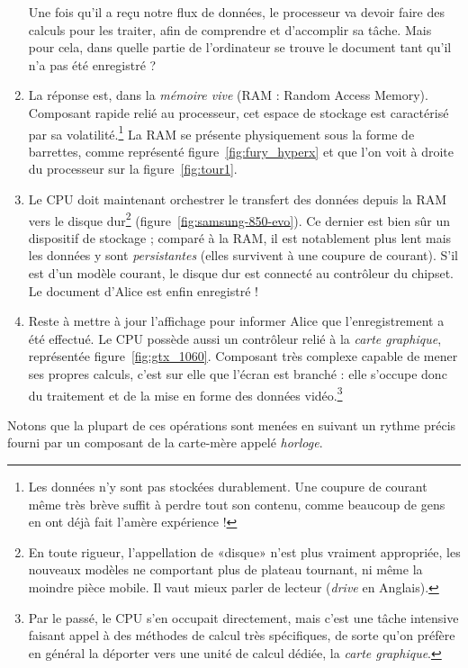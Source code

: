 \begin{enumerate}
	Une fois qu'il a reçu notre flux de données, le processeur va devoir faire des calculs pour les traiter, afin de comprendre et d'accomplir sa tâche. Mais pour cela, dans quelle partie de l'ordinateur se trouve le document tant qu'il n'a pas été enregistré ?
	\item La réponse est, dans la \emph{mémoire vive} (RAM : Random Access Memory). Composant rapide relié au processeur, cet espace de stockage est caractérisé par sa volatilité.\footnote{Les données n'y sont pas stockées durablement. Une coupure de courant même très brève suffit à perdre tout son contenu, comme beaucoup de gens en ont déjà fait l'amère expérience !} La RAM se présente physiquement sous la forme de barrettes, comme représenté figure~\ref{fig:fury_hyperx} et que l'on voit à droite du processeur sur la figure~\ref{fig:tour1}.
	\item Le CPU doit maintenant orchestrer le transfert des données depuis la RAM vers le disque dur\footnote{En toute rigueur, l'appellation de «disque» n'est plus vraiment appropriée, les nouveaux modèles ne comportant plus de plateau tournant, ni même la moindre pièce mobile. Il vaut mieux parler de lecteur (\emph{drive} en Anglais).} (figure~\ref{fig:samsung-850-evo}). Ce dernier est bien sûr un dispositif de stockage ; comparé à la RAM, il est notablement plus lent mais les données y sont \emph{persistantes} (elles survivent à une coupure de courant). S'il est d'un modèle courant, le disque dur est connecté au contrôleur du chipset. Le document d'Alice est enfin enregistré !
	\item Reste à mettre à jour l'affichage pour informer Alice que l'enregistrement a été effectué. Le CPU possède aussi un contrôleur relié à la \emph{carte graphique}, représentée figure~\ref{fig:gtx_1060}. Composant très complexe capable de mener ses propres calculs, c'est sur elle que l'écran est branché : elle s'occupe donc du traitement et de la mise en forme des données vidéo.\footnote{Par le passé, le CPU s'en occupait directement, mais c'est une tâche intensive faisant appel à des méthodes de calcul très spécifiques, de sorte qu'on préfère en général la déporter vers une unité de calcul dédiée, la \emph{carte graphique}.}
\end{enumerate}
Notons que la plupart de ces opérations sont menées en suivant un rythme précis fourni par un composant de la carte-mère appelé \emph{horloge}.
